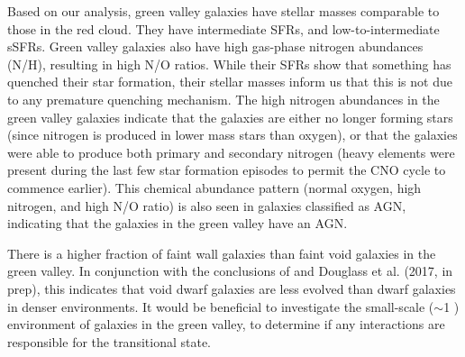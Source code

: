 Based on our analysis, green valley galaxies have stellar masses comparable to 
those in the red cloud.  They have intermediate SFRs, and low-to-intermediate 
sSFRs.  Green valley galaxies also have high gas-phase nitrogen abundances (N/H), 
resulting in high N/O ratios.  While their SFRs show that something has quenched 
their star formation, their stellar masses inform us that this is not due to any 
premature quenching mechanism.  The high nitrogen abundances in the green valley 
galaxies indicate that the galaxies are either no longer forming stars (since 
nitrogen is produced in lower mass stars than oxygen), or that the galaxies were 
able to produce both primary and secondary nitrogen (heavy elements were present 
during the last few star formation episodes to permit the CNO cycle to commence 
earlier).  This chemical abundance pattern (normal oxygen, high nitrogen, and 
high N/O ratio) is also seen in galaxies classified as AGN, indicating that the 
galaxies in the green valley have an AGN.

There is a higher fraction of faint wall galaxies than faint void galaxies in 
the green valley.  In conjunction with the conclusions of \cite{Douglass17b} and 
Douglass et al. (2017, in prep), this indicates that void dwarf galaxies are 
less evolved than dwarf galaxies in denser environments.  It would be beneficial 
to investigate the small-scale ($\sim$1 \hMpc) environment of galaxies in the 
green valley, to determine if any interactions are responsible for the 
transitional state.